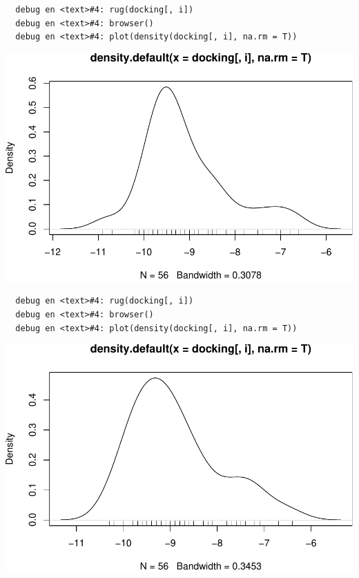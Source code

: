 \documentclass[12pt,twoside]{reedthesis}
\begin{document}
  \begin{verbatim}
  debug en <text>#4: rug(docking[, i])
  debug en <text>#4: browser()
  debug en <text>#4: plot(density(docking[, i], na.rm = T))
  \end{verbatim}
  
  \begin{center}\includegraphics{tesis_files/figure-latex/johan-9} \end{center}
  
  \begin{verbatim}
  debug en <text>#4: rug(docking[, i])
  debug en <text>#4: browser()
  debug en <text>#4: plot(density(docking[, i], na.rm = T))
  \end{verbatim}
  
  \begin{center}\includegraphics{tesis_files/figure-latex/johan-10} \end{center}
  
\end{document}
